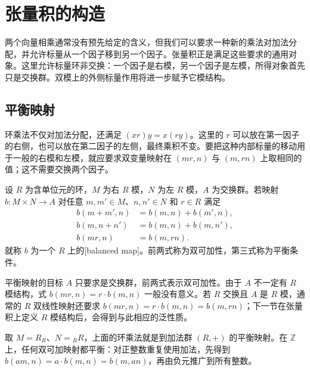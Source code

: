
\section{张量积的构造}
\label{b2:sec:0601}

两个向量相乘通常没有预先给定的含义，但我们可以要求一种新的乘法对加法分配，并允许标量从一个因子移到另一个因子。张量积正是满足这些要求的通用对象。这里允许标量环非交换：一个因子是右模，另一个因子是左模，所得对象首先只是交换群。双模上的外侧标量作用将进一步赋予它模结构。

%
%

\subsection{平衡映射}
\label{b2:subsec:0601:01}

环乘法不仅对加法分配，还满足 \((xr)y=x(ry)\)。这里的 \(r\) 可以放在第一因子的右侧，也可以放在第二因子的左侧，最终乘积不变。要把这种内部标量的移动用于一般的右模和左模，就应要求双变量映射在 \((mr,n)\) 与 \((m,rn)\) 上取相同的值；这不需要交换两个因子。

\begin{definition}\label{b2:def:balanced-map}
	设 \(R\) 为含单位元的环，\(M\) 为右 \(R\) 模，\(N\) 为左 \(R\) 模，\(A\) 为交换群。若映射 \(b:M\times N\to A\) 对任意 \(m,m'\in M\)、\(n,n'\in N\) 和 \(r\in R\) 满足
	\[
		\begin{aligned}
			b(m+m',n)&=b(m,n)+b(m',n),\\
			b(m,n+n')&=b(m,n)+b(m,n'),\\
			b(mr,n)&=b(m,rn).
		\end{aligned}
	\]
	就称 \(b\) 为一个 \(R\) 上的[balanced map]。前两式称为双可加性，第三式称为平衡条件。
\end{definition}

平衡映射的目标 \(A\) 只要求是交换群，前两式表示双可加性。由于 \(A\) 不一定有 \(R\) 模结构，式 \(b(mr,n)=r\cdot b(m,n)\) 一般没有意义。若 \(R\) 交换且 \(A\) 是 \(R\) 模，通常的 \(R\) 双线性映射还要求 \(b(mr,n)=r\cdot b(m,n)=b(m,rn)\)；下一节在张量积上定义 \(R\) 模结构后，会得到与此相应的泛性质。

\ProseParagraphBreak
取 \(M=R_R\)、\(N={}_RR\)，上面的环乘法就是到加法群 \((R,+)\) 的平衡映射。在 \(\mathbb Z\) 上，任何双可加映射都平衡：对正整数重复使用加法，先得到 \(b(am,n)=a\cdot b(m,n)=b(m,an)\)，再由负元推广到所有整数。

